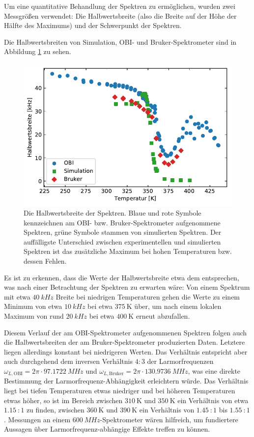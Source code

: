 Um eine quantitative Behandlung der Spektren zu ermöglichen, wurden zwei Messgrößen verwendet: Die Halbwertsbreite (also die Breite auf der Höhe der Hälfte des Maximums) und der Schwerpunkt der Spektren. 

Die Halbwertsbreiten von Simulation, OBI- und Bruker-Spektrometer sind in Abbildung \ref{fig:res:spek_fwhm} zu sehen.
\begin{figure}
	\begin{center}
		\includegraphics[width=.9\textwidth]{graphics/plot/fwhm.pdf}
	\end{center}
	\caption{Die Halbwertsbreite der Spektren. Blaue und rote Symbole kennzeichnen am OBI- bzw. Bruker-Spektrometer aufgenommene Spektren, grüne Symbole stammen von simulierten Spektren. Der auffälligste Unterschied zwischen experimentellen und simulierten Spektren ist das zusätzliche Maximum bei hohen Temperaturen bzw. dessen Fehlen.} \label{fig:res:spek_fwhm}
\end{figure}

Es ist zu erkennen, dass die Werte der Halbwertsbreite etwa dem entsprechen, was nach einer Betrachtung der Spektren zu erwarten wäre: Von einem Spektrum mit etwa $\SI{40}{kHz}$ Breite bei niedrigen Temperaturen gehen die Werte zu einem Minimum von etwa $\SI{10}{kHz}$ bei etwa $\SI{375}{\kelvin}$ über, um nach einem lokalen Maximum von rund $\SI{20}{kHz}$ bei etwa $\SI{400}{\kelvin}$ erneut abzufallen.

Diesem Verlauf der am OBI-Spektrometer aufgenommenen Spektren folgen auch die Halbwertsbreiten der am Bruker-Spektrometer produzierten Daten. Letztere liegen allerdings konstant bei niedrigeren Werten. Das Verhältnis entspricht aber auch durchgehend dem inversen Verhältnis $4:3$ der Larmorfrequenzen $\omega_{L, \text{OBI}} = 2\pi \cdot \SI{97.1722}{MHz}$ und $\omega_{L, \text{Bruker}} = 2\pi \cdot \SI{130.9736}{MHz}$, was eine direkte Bestimmung der Lar\-mor\-fre\-quenz-Ab\-häng\-ig\-keit erleichtern würde. Das Verhältnis liegt bei tiefen Temperaturen etwas niedriger und bei höheren Temperaturen etwas höher, so ist im Bereich zwischen $\SI{310}{\kelvin}$ und $\SI{350}{\kelvin}$ ein Verhältnis von etwa $\SI{1.15}{}:1$ zu finden, zwischen $\SI{360}{\kelvin}$ und $\SI{390}{\kelvin}$ ein Verhältnis von $\SI{1.45}{}:1$ bis $\SI{1.55}{}:1$. Messungen an einem $\SI{600}{MHz}$-Spektrometer wären hilfreich, um fundiertere Aussagen über Larmorfrequenz-abhängige Effekte treffen zu können.

